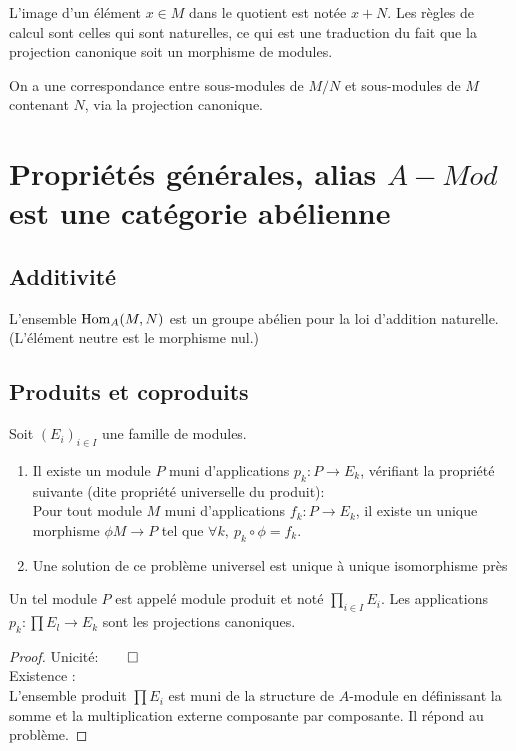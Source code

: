 L'image d'un élément $x \in M$ dans le quotient est notée $x+N$. Les règles de calcul sont celles qui sont naturelles, ce qui est une traduction du fait que la projection canonique soit un morphisme de modules.

On a une correspondance entre sous-modules de $M/N$ et sous-modules de $M$ contenant $N$, via la projection canonique.

\section{Propriétés générales, alias \og $A-Mod$ est une catégorie abélienne \fg}
\subsection{Additivité}

\begin{proposition}
L'ensemble $\operatorname{Hom}_A(M,N)$ est un groupe abélien pour la loi d'addition naturelle. (L'élément neutre est le morphisme nul.)
\end{proposition}

\subsection{Produits et coproduits}


\begin{propdef}
Soit $(E_i)_{i \in I}$ une famille de modules.
\begin{enumerate}
\item Il existe un module $P$ muni d'applications $p_k : P \to E_k$, vérifiant la propriété suivante (dite propriété universelle du produit):\\
Pour tout module $M$ muni d'applications $f_k : P \to E_k$, il existe un unique morphisme $\phi M \to P$ tel que $\forall k,\: p_k\circ \phi =f_k$.
\item Une solution de ce problème universel est unique à unique isomorphisme près
\end{enumerate}
Un tel module $P$ est appelé module produit et noté $\prod_{i \in I} E_i$. Les applications $p_k : \prod E_l \to E_k$ sont les projections canoniques.
\end{propdef}
\begin{proof}
Unicité:$\qed$\\
Existence :\\
L'ensemble produit $\prod E_i$ est muni de la structure de $A$-module en définissant la somme et la multiplication externe composante par composante.  Il répond au problème.
\end{proof}

